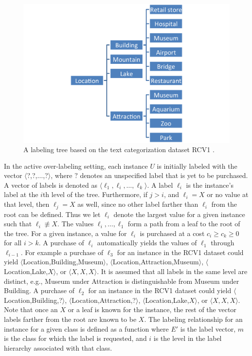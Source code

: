 \documentclass[ms]{nuthesis}
\begin{document}
\FloatBarrier
\begin{figure}[!htb]
	\centering
    \includegraphics[width=0.85\columnwidth]{fig/exp-ontology}
    \caption{A labeling tree based on the text categorization dataset RCV1 \cite{Lewis2004}.}
    \label{fig:exp-ontology}
\end{figure}
\FloatBarrier

In the active over-labeling setting, each instance $U$ is initially labeled with the vector
$\langle$?,?,$\ldots$,?$\rangle$, where $?$ denotes an unspecified label that is yet to be
purchased. A vector of labels is denoted as $\langle \ell_1,\ell_i,\ldots,\ell_k \rangle$.
A label $\ell_i$ is the instance's label at the $i$th
level of the tree. Furthermore, if $j > i$, and $\ell_i = X$ or no value at that level,
then $\ell_j=X$ as well, since no other label farther than $\ell_i$
from the root can be defined. Thus we let $\ell_i$ denote the largest value for a given
 instance such that $\ell_i \not\equiv X$. The values $\ell_i,\ldots,\ell_1$ form a path
  from a leaf to the root of the tree. For a given instance, a value for $\ell_i$ is purchased
  at a cost $c_i \geq c_k \geq 0$ for all $i>k$. A purchase of $\ell_i$ automatically
  yields the values of $\ell_1$ through $\ell_{i-1}$. For example a purchase of $\ell_3$ for
  an instance in the RCV1 dataset could yield $\langle$Location,Building,Museum$\rangle$,  $\langle$Location,Attraction,Museum$\rangle$,
$\langle$Location,Lake,$X\rangle$, or $\langle X,X,X \rangle$. It is assumed
that all labels in the same level are distinct, e.g., Museum under Attraction
is distinguishable from Museum under Building. A purchase of $\ell_2$ for an instance
in the RCV1 dataset could yield $\langle$Location,Building,?$\rangle$,  $\langle$Location,Attraction,?$\rangle$,
$\langle$Location,Lake,$X\rangle$, or $\langle X,X,X \rangle$. Note that once an $X$ or
a leaf is known for the instance, the rest of the vector labels farther from the root are
known to be $X$. The labeling relationship for an instance for a given
class is defined as a function
 where $E'$ is the label vector,
$m$ is the class for which the label is requested, and $i$ is the
level in the label hierarchy associated with that class.
\end{document}
